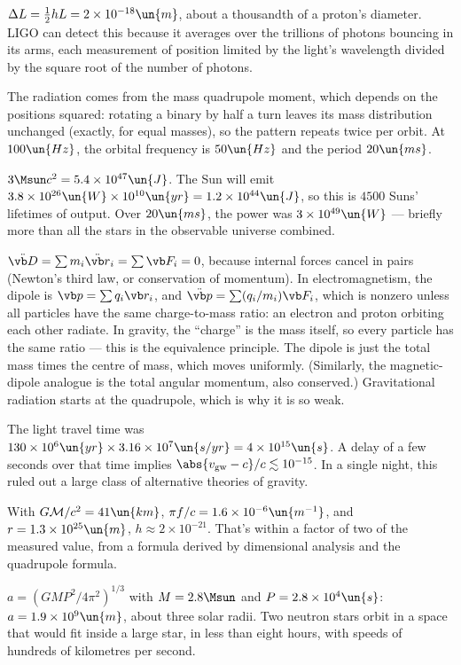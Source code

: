 
 $\Delta L = \tfrac12hL = 2\times10^{-18}\un{m}$, about a thousandth of a proton's diameter. LIGO can detect this because it averages over the trillions of photons bouncing in its arms, each measurement of position limited by the light's wavelength divided by the square root of the number of photons.

 The radiation comes from the mass quadrupole moment, which depends on the positions squared: rotating a binary by half a turn leaves its mass distribution unchanged (exactly, for equal masses), so the pattern repeats twice per orbit. At $100\un{Hz}$, the orbital frequency is $50\un{Hz}$ and the period $20\un{ms}$.

 $3\Msun c^2 = 5.4\times10^{47}\un{J}$. The Sun will emit $3.8\times10^{26}\un{W}\times10^{10}\un{yr} = 1.2\times10^{44}\un{J}$, so this is $4500$ Suns' lifetimes of output. Over $20\un{ms}$, the power was $3\times10^{49}\un{W}$ --- briefly more than all the stars in the observable universe combined.

 $\ddot{\vb D} = \sum m_i\ddot{\vb r}_i = \sum\vb F_i = 0$, because internal forces cancel in pairs (Newton's third law, or conservation of momentum). In electromagnetism, the dipole is $\vb p = \sum q_i\vb r_i$, and $\ddot{\vb p} = \sum(q_i/m_i)\vb F_i$, which is nonzero unless all particles have the same charge-to-mass ratio: an electron and proton orbiting each other radiate. In gravity, the ``charge'' is the mass itself, so every particle has the same ratio --- this is the equivalence principle. The dipole is just the total mass times the centre of mass, which moves uniformly. (Similarly, the magnetic-dipole analogue is the total angular momentum, also conserved.) Gravitational radiation starts at the quadrupole, which is why it is so weak.

 The light travel time was $130\times10^6\un{yr}\times3.16\times10^7\un{s/yr} = 4\times10^{15}\un{s}$. A delay of a few seconds over that time implies $\abs{v_{\text{gw}}-c}/c\lesssim10^{-15}$. In a single night, this ruled out a large class of alternative theories of gravity.

 With $G\mathcal M/c^2 = 41\un{km}$, $\pi f/c = 1.6\times10^{-6}\un{m^{-1}}$, and $r = 1.3\times10^{25}\un{m}$, $h\approx2\times10^{-21}$. That's within a factor of two of the measured value, from a formula derived by dimensional analysis and the quadrupole formula.

 $a = (GMP^2/4\pi^2)^{1/3}$ with $M = 2.8\Msun$ and $P = 2.8\times10^4\un{s}$: $a = 1.9\times10^9\un{m}$, about three solar radii. Two neutron stars orbit in a space that would fit inside a large star, in less than eight hours, with speeds of hundreds of kilometres per second.

